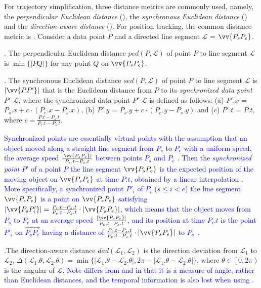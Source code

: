 For trajectory simplification, three distance metrics are commonly used, namely, the \emph{perpendicular Euclidean distance} (\ped), the \emph{synchronous Euclidean distance} \cite{Meratnia:Spatiotemporal} (\sed) and the \emph{direction-aware distance}\cite{Long:Direction, Zhang:Evaluation} (\dad). For position tracking, the common distance metric is \sed.
%
Consider a data point $P$ and a directed line segment $\mathcal{L}$ = $\vv{P_{s}P_{e}}$.

. The perpendicular Euclidean distance $ped\left(P, \mathcal{L}\right)$ of point $P$ to line segment $\mathcal{L}$ is $\min\{|PQ|\}$ for any point $Q$ on $\vv{P_{s}P_{e}}$.

. The synchronous Euclidean distance $sed\left(P, \mathcal{L}\right)$ of point $P$ to line segment $\mathcal{L}$ is $|\vv{PP'}|$ that is the Euclidean distance from $P$ to its \textit{synchronized data point} $P'$ \wrt $\mathcal{L}$, where the synchronized data point $P'$ \wrt $\mathcal{L}$ is defined as follows:
(a) $P'.x$ = $P_s.x +  c\cdot\left(P_e.x - P_s.x\right)$,
(b) $P'.y$ = $P_s.y +  c\cdot\left(P_e.y - P_s.y\right)$ and
(c) $P'.t$ = $P.t$, where $c= \frac{P.t-P_s.t}{P_e.t-P_s.t}$.

\textcolor{blue}{Synchronized points are essentially virtual points with the assumption that an object moved along a straight line segment from $P_s$ to $P_e$ with a uniform speed, \ie the average speed $\frac{|\vv{P_sP_e}|}{P_e.t-P_s.t}$ between points $P_s$ and $P_e$ \cite{Cao:Spatio,Lin:Cised}. Then the \emph{synchronized point} $P'$ of a point $P$ \wrt the line segment $\vv{P_sP_e}$ is the expected position of the moving object on $\vv{P_sP_e}$ at time $P.t$, obtained by a linear interpolation \cite{Cao:Spatio}. More specifically, a synchronized point $P'_i$ of $P_i$ ($s\le i < e$) \wrt the line segment $\vv{P_sP_e}$ is a point on $\vv{P_sP_{e}}$ satisfying ${|\vv{P_sP'_i}|} = \frac{P_i.t - P_s.t}{P_e.t - P_s.t}\cdot {|\vv{P_sP_e}|}$, which means that the object moves from $P_s$ to $P_e$ at an average speed $\frac{|\vv{P_sP_e}|}{P_e.t-P_s.t}$, and its position at time $P_i.t$ is the point $P'_i$ on $\overrightarrow{P_sP_{e}}$ having a distance of $\frac{P_i.t - P_s.t}{P_e.t - P_s.t}\cdot|\vv{P_sP_e}|$ to $P_s$~\cite{Cao:Spatio, Lin:Cised,Meratnia:Spatiotemporal, Chen:Fast, Zhang:Evaluation}.}

.The direction-aware distance $dad\left(\mathcal{L}_1, \mathcal{L}_2\right)$ is the direction deviation from $\mathcal{L}_1$ to $\mathcal{L}_2$, \ie $\Delta\left(\mathcal{L}_1.\theta, \mathcal{L}_2.\theta\right) = \min\{|\mathcal{L}_1.\theta - \mathcal{L}_2.\theta|, 2\pi - |\mathcal{L}_1.\theta - \mathcal{L}_2.\theta|\}$, where $\theta \in \left[0, 2\pi\right)$ is the angular of $\mathcal{L}$.
\textcolor{blue}{Note \dad differs from \ped and \sed in that it is a measure of angle, rather than Euclidean distances, and the temporal information is also lost when using \dad.}

